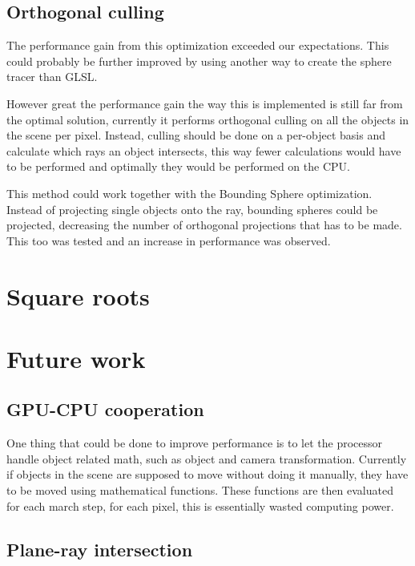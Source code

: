 		\subsection{Orthogonal culling}

			The performance gain from this optimization exceeded our 
			expectations. This could probably be further improved by using
			another way to create the sphere tracer than GLSL. 

			However great the performance gain the way this is implemented
			is still far from the optimal solution, currently it performs 
			orthogonal culling on all the objects in the scene per pixel. 
			Instead, culling should be done on a per-object basis and calculate
			which rays an object intersects, this way fewer calculations would
			have to be performed and optimally they would be performed on the
			CPU.

			This method could work together with the Bounding Sphere 
			optimization. Instead of projecting single objects onto the ray,
			bounding spheres could be projected, decreasing the number of 
			orthogonal projections that has to be made. This too was tested 
			and an increase in performance was observed.

	\section{Square roots}

		

	\section{Future work}

		\subsection{GPU-CPU cooperation}
			One thing that could be done to improve performance is to let the
			processor handle object related math, such as object and camera 
			transformation. Currently if objects in the scene are supposed to 
			move without doing it manually, they have to be moved using 
			mathematical functions. These functions are then evaluated for 
			each march step, for each pixel, this is essentially wasted 
			computing power.


		\subsection{Plane-ray intersection}

